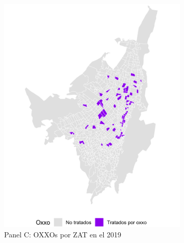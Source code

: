 \documentclass{article}
\begin{document}
\begin{figure}
    \begin{subfigure}[b]{0.4\textwidth} %
        \includegraphics[width=\linewidth]{figs_oxxo_maps/mapa_oxxos_binary_2019.png}
        \caption{Panel C: OXXOs por ZAT en el 2019}
        \label{fig:panelC}
    \end{subfigure}
    \hfill
    \begin{subfigure}[b]{0.4\textwidth} %

\end{subfigure}
\end{figure}
\end{document}

